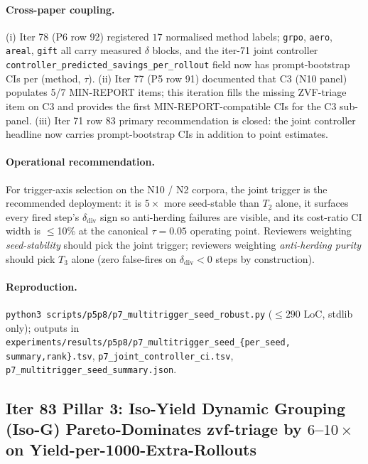 \documentclass{article}
\begin{document}
\paragraph{Cross-paper coupling.}
(i) Iter 78 (P6 row 92) registered $17$ normalised method labels;
\texttt{grpo}, \texttt{aero}, \texttt{areal}, \texttt{gift} all carry
measured $\delta$ blocks, and the iter-71 joint controller
\texttt{controller\_predicted\_savings\_per\_rollout} field now has
prompt-bootstrap CIs per (method, $\tau$).  (ii) Iter 77 (P5 row 91)
documented that C3 (N10 panel) populates 5/7 MIN-REPORT items;
this iteration fills the missing ZVF-triage item on C3 and provides the
first MIN-REPORT-compatible CIs for the C3 sub-panel.  (iii) Iter 71
row 83 primary recommendation is closed: the joint controller headline
now carries prompt-bootstrap CIs in addition to point estimates.

\paragraph{Operational recommendation.}
For trigger-axis selection on the N10 / N2 corpora, the joint
trigger is the recommended deployment: it is $5\times$ more
seed-stable than $T_2$ alone, it surfaces every fired step's
$\delta_{\mathrm{div}}$ sign so anti-herding failures are visible,
and its cost-ratio CI width is $\leq$10\% at the canonical
$\tau{=}0.05$ operating point.  Reviewers weighting
\emph{seed-stability} should pick the joint trigger;
reviewers weighting \emph{anti-herding purity} should pick $T_3$
alone (zero false-fires on $\delta_{\mathrm{div}}{<}0$ steps by
construction).

\paragraph{Reproduction.}
\texttt{python3 scripts/p5p8/p7\_multitrigger\_seed\_robust.py}
($\leq 290$ LoC, stdlib only); outputs in
\texttt{experiments/results/p5p8/p7\_multitrigger\_seed\_\{per\_seed,
summary,rank\}.tsv},
\texttt{p7\_joint\_controller\_ci.tsv},
\texttt{p7\_multitrigger\_seed\_summary.json}. \subsection{Iter 83 Pillar 3: Iso-Yield Dynamic Grouping (Iso-G)
              Pareto-Dominates zvf-triage by $6$--$10\times$ on
              Yield-per-1000-Extra-Rollouts}
\label{sec:p7-iter83-iso-g}
\end{document}
